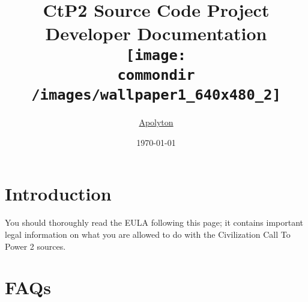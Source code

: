 \documentclass[a4paper,11pt]{book}
\newcommand{\commondir}{../common}
\begin{document}
\title{CtP2 Source Code Project\\[5mm]
Developer Documentation\\[20mm]
\texttt{[image: \\commondir /images/wallpaper1\_640x480\_2]}\\[5mm]}
\author{\href{http://ctp2files.apolyton.net/source/}{Apolyton}}
\date{\today}
\maketitle
\tableofcontents
\newpage
{}
\mainmatter

\chapter{Introduction\label{toc:introduction}}
You should thoroughly read the EULA following this page; it contains important legal information on what you are allowed to do with the Civilization Call To Power 2 sources.






\appendix







\chapter{FAQs}
\newcommand{\addquestion}[2]{\subsection{#1}
#2
}



\backmatter
\end{document}
